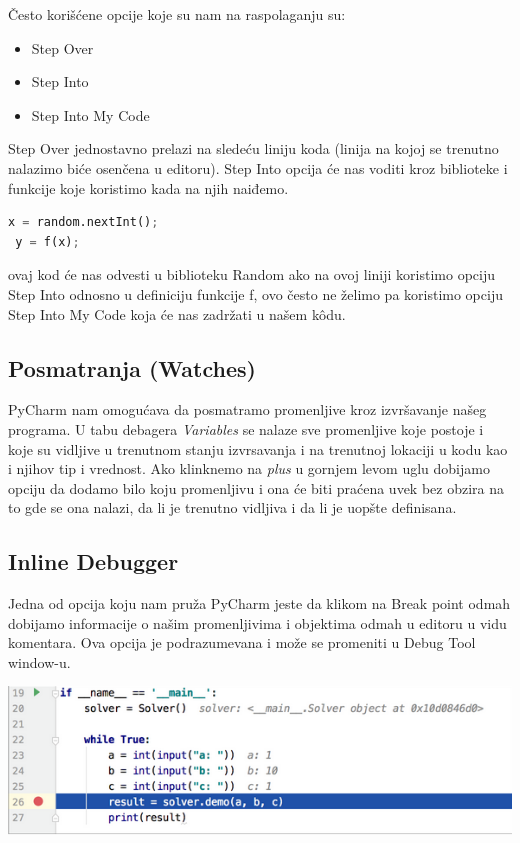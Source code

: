 \documentclass[a4paper]{article}
\begin{document}
Često korišćene opcije koje su nam na raspolaganju su:
\begin{itemize}
\item  Step Over
\item  Step Into
\item Step Into My Code
\end{itemize}
Step Over jednostavno prelazi na sledeću liniju koda (linija na kojoj se trenutno nalazimo biće osenčena u editoru). Step Into opcija će nas voditi kroz biblioteke i funkcije koje koristimo kada na njih naiđemo\cite{pyCharm}.
\begin{lstlisting}[language = Python, caption={Primer neki}]
 x = random.nextInt();
 y = f(x);
\end{lstlisting} 
 ovaj kod će nas odvesti u biblioteku Random ako na ovoj liniji koristimo opciju Step Into odnosno u definiciju funkcije f, ovo često ne želimo pa koristimo opciju Step Into My Code koja će nas zadržati u našem k\^{o}du\cite{pyCharm}. 
\subsection{Posmatranja (Watches)}
PyCharm nam omogućava da posmatramo promenljive kroz izvršavanje našeg programa. U tabu debagera \emph{Variables} se nalaze sve promenljive koje postoje i koje su vidljive u trenutnom stanju izvrsavanja i na trenutnoj lokaciji u kodu kao i njihov tip i vrednost\cite{pyCharm}. Ako klinknemo na \emph {plus} u gornjem levom uglu dobijamo opciju da dodamo bilo koju promenljivu i ona će biti praćena uvek bez obzira na to gde se ona nalazi, da li je trenutno vidljiva i da li je uopšte definisana\cite{pyCharm}.
\subsection{Inline Debugger}
Jedna od opcija koju nam pruža PyCharm jeste da klikom na Break point odmah dobijamo informacije o našim promenljivima i objektima odmah u editoru u vidu komentara. Ova opcija je podrazumevana i može se promeniti u Debug Tool window-u\cite{pyCharm}.


\includegraphics[scale = 0.4]{3}
\end{document}
